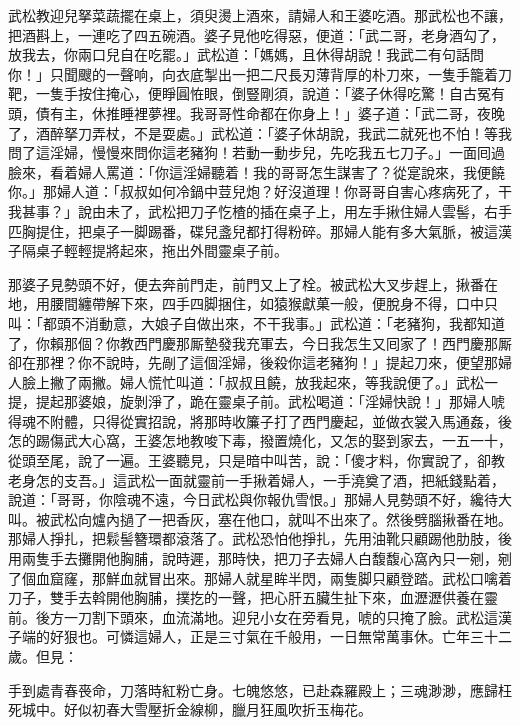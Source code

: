 武松教迎兒拏菜蔬擺在桌上，須臾燙上酒來，請婦人和王婆吃酒。那武松也不讓，把酒斟上，一連吃了四五碗酒。婆子見他吃得惡，便道：「武二哥，老身酒勾了，放我去，你兩口兒自在吃罷。」武松道：「媽媽，且休得胡說！我武二有句話問你！」只聞颼的一聲响，向衣底掣出一把二尺長刃薄背厚的朴刀來，一隻手籠着刀靶，一隻手按住掩心，便睜圓恠眼，倒豎剛須，說道：「婆子休得吃驚！自古冤有頭，債有主，休推睡裡夢裡。我哥哥性命都在你身上！」婆子道：「武二哥，夜晚了，酒醉拏刀弄杖，不是耍處。」武松道：「婆子休胡說，我武二就死也不怕！等我問了這淫婦，慢慢來問你這老豬狗！若動一動步兒，先吃我五七刀子。」一面囘過臉來，看着婦人罵道：「你這淫婦聽着！我的哥哥怎生謀害了？從寔說來，我便饒你。」那婦人道：「叔叔如何冷鍋中荳兒炮？好沒道理！你哥哥自害心疼病死了，干我甚事？」說由未了，武松把刀子忔楂的插在桌子上，用左手揪住婦人雲髻，右手匹胸提住，把桌子一脚踢番，碟兒盞兒都打得粉碎。那婦人能有多大氣脈，被這漢子隔桌子輕輕提將起來，拖出外間靈桌子前。

那婆子見勢頭不好，便去奔前門走，前門又上了栓。被武松大叉步趕上，揪番在地，用腰間纏帶解下來，四手四脚捆住，如猿猴獻菓一般，便脫身不得，口中只叫：「都頭不消動意，大娘子自做出來，不干我事。」武松道：「老豬狗，我都知道了，你賴那個？你教西門慶那厮墊發我充軍去，今日我怎生又囘家了！西門慶那厮卻在那裡？你不說時，先剮了這個淫婦，後殺你這老豬狗！」提起刀來，便望那婦人臉上撇了兩撇。婦人慌忙叫道：「叔叔且饒，放我起來，等我說便了。」武松一提，提起那婆娘，旋剝淨了，跪在靈桌子前。武松喝道：「淫婦快說！」那婦人唬得魂不附體，只得從實招說，將那時收簾子打了西門慶起，並做衣裳入馬通姦，後怎的踢傷武大心窩，王婆怎地教唆下毒，撥置燒化，又怎的娶到家去，一五一十，從頭至尾，說了一遍。{}王婆聽見，只是暗中叫苦，說：「傻才料，你實說了，卻教老身怎的支吾。」{}這武松一面就靈前一手揪着婦人，一手澆奠了酒，把紙錢點着，說道：「哥哥，你陰魂不遠，今日武松與你報仇雪恨。」那婦人見勢頭不好，纔待大叫。被武松向爐內撾了一把香灰，塞在他口，就叫不出來了。然後劈腦揪番在地。那婦人掙扎，把鬏髻簪環都滾落了。{}武松恐怕他掙扎，先用油靴只顧踢他肋肢，後用兩隻手去攤開他胸脯，說時遲，那時快，把刀子去婦人白馥馥心窩內只一剜，剜了個血窟窿，那鮮血就冒出來。那婦人就星眸半閃，兩隻脚只顧登踏。武松口噙着刀子，雙手去斡開他胸脯，撲扢的一聲，把心肝五臟生扯下來，血瀝瀝供養在靈前。後方一刀割下頭來，血流滿地。{}迎兒小女在旁看見，唬的只掩了臉。武松這漢子端的好狠也。可憐這婦人，正是三寸氣在千般用，一日無常萬事休。亡年三十二歲。但見：

\begin{myquote}
手到處青春䘮命，刀落時紅粉亡身。七魄悠悠，已赴森羅殿上；三魂渺渺，應歸枉死城中。好似初春大雪壓折金線柳，臘月狂風吹折玉梅花。
\end{myquote}


